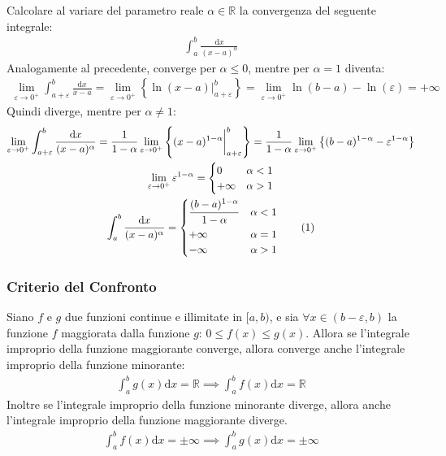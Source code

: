 \documentclass{article}
\newcommand{\df}{\mathrm{d}}
\numberwithin{equation}{subsection}
\newcommand{\tageq}{\tag{\stepcounter{equation}\theequation}}
\begin{document}
Calcolare al variare del parametro reale $\alpha\in\mathbb{R}$ la convergenza del seguente integrale:
\begin{gather*}
    \displaystyle\int_a^b\frac{\mathrm{d}x}{(x-a)^\alpha}    
\end{gather*}
Analogamente al precedente, converge per $\alpha\leq0$, mentre per $\alpha=1$ diventa:
\begin{gather*}
    \lim_{\varepsilon\to0^+}\int_{a+\varepsilon}^b\frac{\df x}{x-a}=\lim_{\varepsilon\to0^+}\left\{\ln(x-a)\bigg|_{a+\varepsilon}^b\right\}=\lim_{\varepsilon\to0^+}\ln(b-a)-\ln(\varepsilon)=+\infty
\end{gather*}
Quindi diverge, mentre per $\alpha\neq1$:
\begin{gather*}
    \lim_{\varepsilon\to0^+}\int_{a+\varepsilon}^b\frac{\mathrm{d}x}{(x-a)^\alpha}=\frac{1}{1-\alpha}\lim_{\varepsilon\to0^+}\left\{(x-a)^{1-\alpha}\bigg|_{a+\varepsilon}^b\right\}=\frac{1}{1-\alpha}\lim_{\varepsilon\to0^+}\left\{(b-a)^{1-\alpha}-\varepsilon^{1-\alpha}\right\}\\
    \lim_{\varepsilon\to0^+}\varepsilon^{1-\alpha}=\begin{cases}
        0&\alpha<1\\+\infty&\alpha>1
    \end{cases}\\
    \int_a^b\frac{\df x}{(x-a)^\alpha}=\begin{cases}
        \displaystyle\frac{\strut(b-a)^{1-\alpha}}{\strut1-\alpha}&\alpha<1\\
        +\infty&\alpha=1\\
        -\infty&\alpha>1
    \end{cases}\tageq
\end{gather*}

\subsubsection{Criterio del Confronto}

Siano $f$ e $g$ due funzioni continue e illimitate in $[a, b)$, e sia $\forall x\in(b-\varepsilon, b)$ la funzione $f$ maggiorata dalla funzione $g$: $0\leq f(x)\leq g(x)$. 
Allora se l'integrale improprio della funzione maggiorante converge, allora converge anche l'integrale improprio della funzione minorante:
\begin{gather}
    \displaystyle\int_a^b g(x)\mathrm{d}x=\mathbb{R}\implies
    \displaystyle\int_a^b f(x)\mathrm{d}x=\mathbb{R}
\end{gather}
Inoltre se l'integrale improprio della funzione minorante diverge, allora anche l'integrale improprio della funzione maggiorante diverge. 
\begin{gather}
    \displaystyle\int_a^b f(x)\mathrm{d}x=\pm\infty\implies
    \displaystyle\int_a^b g(x)\mathrm{d}x=\pm\infty
\end{gather}
\end{document}
